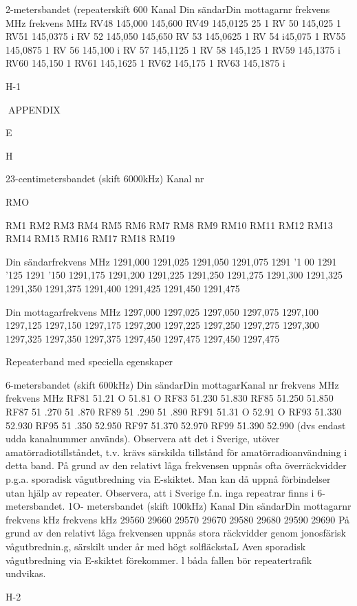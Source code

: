 2-metersbandet (repeaterskift 600
Kanal
Din sändarDin mottagarnr
frekvens MHz
frekvens MHz
RV48
145,000
145,600
RV49
145,0125
25
1
RV 50
145,025
1
RV51
145,0375
i
RV 52
145,050
145,650
RV 53
145,0625
1
RV 54
i45,075
1
RV55
145,0875
1
RV 56
145,100
i
RV 57
145,1125
1
RV 58
145,125
1
RV59
145,1375
i
RV60
145,150
1
RV61
145,1625
1
RV62
145,175
1
RV63
145,1875
i

H-1

APPENDIX

E

H

23-centimetersbandet (skift 6000kHz)
Kanal
nr

RMO

RM1
RM2
RM3
RM4
RM5
RM6
RM7
RM8
RM9
RM10
RM11
RM12
RM13
RM14
RM15
RM16
RM17
RM18
RM19

Din sändarfrekvens MHz
1291,000
1291,025
1291,050
1291,075
1291 '1 00
1291 '125
1291 '150
1291,175
1291,200
1291,225
1291,250
1291,275
1291,300
1291,325
1291,350
1291,375
1291,400
1291,425
1291,450
1291,475

Din mottagarfrekvens MHz
1297,000
1297,025
1297,050
1297,075
1297,100
1297,125
1297,150
1297,175
1297,200
1297,225
1297,250
1297,275
1297,300
1297,325
1297,350
1297,375
1297,450
1297,475
1297,450
1297,475

Repeaterband med speciella egenskaper

6-metersbandet (skift 600kHz)
Din sändarDin mottagarKanal
nr
frekvens MHz frekvens MHz
RF81
51.21 O
51.81 O
RF83
51.230
51.830
RF85
51.250
51.850
RF87
51 .270
51 .870
RF89
51 .290
51 .890
RF91
51.31 O
52.91 O
RF93
51.330
52.930
RF95
51 .350
52.950
RF97
51.370
52.970
RF99
51.390
52.990
(dvs endast udda kanalnummer används).
Observera att det i Sverige, utöver amatörradiotillståndet, t.v. krävs särskilda tillstånd
för amatörradioanvändning i detta band.
På grund av den relativt låga frekvensen
uppnås ofta överräckvidder p.g.a. sporadisk
vågutbredning via E-skiktet. Man kan då
uppnå förbindelser utan hjälp av repeater.
Observera, att i Sverige f.n. inga repeatrar
finns i 6-metersbandet.
1O- metersbandet (skift 100kHz)
Kanal
Din sändarDin mottagarnr
frekvens kHz
frekvens kHz
29560
29660
29570
29670
29580
29680
29590
29690
På grund av den relativt låga frekvensen
uppnås stora räckvidder genom jonosfärisk
vågutbrednin.g, särskilt under år med högt
solfläckstaL Aven sporadisk vågutbredning
via E-skiktet förekommer. l båda fallen bör
repeatertrafik undvikas.

H-2
